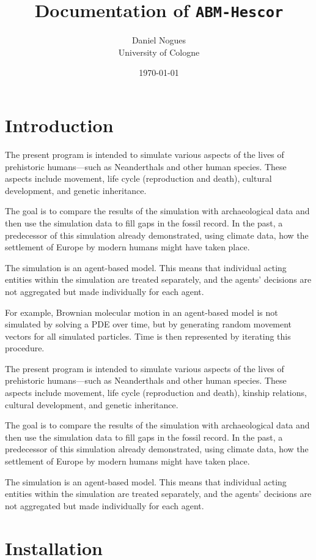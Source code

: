 \documentclass[11pt,a4paper]{article}
\title{Documentation of \texttt{ABM-Hescor}}
\author{Daniel Nogues \\ University of Cologne}
\date{\today}
\begin{document}
\maketitle
\tableofcontents
\newpage

\section{Introduction}
The present program is intended to simulate various aspects of the lives of prehistoric humans—such as Neanderthals and other human species. These aspects include movement, life cycle (reproduction and death), cultural development, and genetic inheritance.

The goal is to compare the results of the simulation with archaeological data and then use the simulation data to fill gaps in the fossil record. In the past, a predecessor of this simulation already demonstrated, using climate data, how the settlement of Europe by modern humans might have taken place.

The simulation is an agent-based model. This means that individual acting entities within the simulation are treated separately, and the agents’ decisions are not aggregated but made individually for each agent.

For example, Brownian molecular motion in an agent-based model is not simulated by solving a PDE over time, but by generating random movement vectors for all simulated particles. Time is then represented by iterating this procedure.

The present program is intended to simulate various aspects of the lives of prehistoric humans—such as Neanderthals and other human species. These aspects include movement, life cycle (reproduction and death), kinship relations, cultural development, and genetic inheritance.

The goal is to compare the results of the simulation with archaeological data and then use the simulation data to fill gaps in the fossil record. In the past, a predecessor of this simulation already demonstrated, using climate data, how the settlement of Europe by modern humans might have taken place.

The simulation is an agent-based model. This means that individual acting entities within the simulation are treated separately, and the agents’ decisions are not aggregated but made individually for each agent.



\section{Installation}
\end{document}
